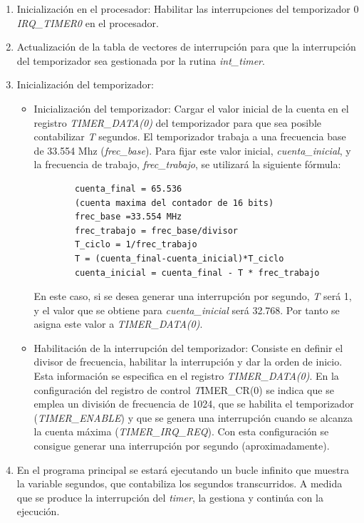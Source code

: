 \begin{enumerate}
	\item Inicialización en el procesador: Habilitar las interrupciones del temporizador 0 \textit{IRQ\_TIMER0} en el procesador.
	\item Actualización de  la tabla de vectores de interrupción para que la interrupción del temporizador  sea gestionada por la rutina \textit{int\_timer}. 
	\item Inicialización del temporizador:
	\begin{itemize}
		\item Inicialización del temporizador: Cargar el valor inicial de la cuenta en el registro \textit{TIMER\_DATA(0)} del temporizador para que sea posible contabilizar \textit{T} segundos. El temporizador trabaja a una frecuencia base de 33.554 Mhz (\textit{frec\_base}). Para fijar este valor inicial,  \textit{cuenta\_inicial}, y la frecuencia de trabajo, \textit{frec\_trabajo}, se utilizará la siguiente fórmula:
		
		\begin{verbatim}
		cuenta_final = 65.536 
		(cuenta maxima del contador de 16 bits)
		frec_base =33.554 MHz
		frec_trabajo = frec_base/divisor 
		T_ciclo = 1/frec_trabajo
		T = (cuenta_final-cuenta_inicial)*T_ciclo
		cuenta_inicial = cuenta_final - T * frec_trabajo
		\end{verbatim}
		
		En este caso, si se desea generar una interrupción por segundo, \textit{T} será 1, y el valor que se obtiene para \textit{cuenta\_inicial} será 32.768. Por tanto se asigna este valor a \textit{TIMER\_DATA(0)}.
		\item Habilitación de la interrupción del temporizador:  Consiste en definir el divisor de frecuencia, habilitar la interrupción y dar la orden de inicio. Esta información se especifica en el registro \textit{TIMER\_DATA(0)}. 
		En la configuración del registro de control {\textit TIMER\_CR(0)} se indica que se emplea un división de frecuencia de 1024, que se habilita el temporizador (\textit{TIMER\_ENABLE}) y que se genera una interrupción cuando se alcanza la cuenta máxima (\textit{TIMER\_IRQ\_REQ}). Con esta configuración se consigue generar una interrupción por segundo (aproximadamente).
		\end {itemize}
		\item En el programa principal se estará ejecutando un bucle infinito que muestra la variable segundos, que contabiliza los segundos transcurridos. A medida que se produce la interrupción del \textit{timer}, la gestiona y continúa con la ejecución.  
	\end{enumerate}
	
